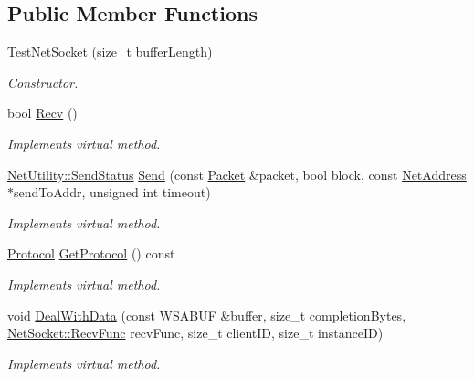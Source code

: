 \subsection*{Public Member Functions}
\begin{DoxyCompactItemize}
\item 
\hyperlink{class_test_net_socket_a3dd4eaac2581358d27bb10b3525fd250}{TestNetSocket} (size\_\-t bufferLength)
\begin{DoxyCompactList}\small\item\em Constructor. \item\end{DoxyCompactList}\item 
\hypertarget{class_test_net_socket_a2b1b26ddbc607a96f8cfb87d43a0ff2b}{
bool \hyperlink{class_test_net_socket_a2b1b26ddbc607a96f8cfb87d43a0ff2b}{Recv} ()}
\label{class_test_net_socket_a2b1b26ddbc607a96f8cfb87d43a0ff2b}

\begin{DoxyCompactList}\small\item\em Implements virtual method. \item\end{DoxyCompactList}\item 
\hyperlink{class_net_utility_a8051eca61204ffd818281419bbf44736}{NetUtility::SendStatus} \hyperlink{class_test_net_socket_a8532d19ebb469fa60ed3c66ca62ad0b7}{Send} (const \hyperlink{class_packet}{Packet} \&packet, bool block, const \hyperlink{class_net_address}{NetAddress} $\ast$sendToAddr, unsigned int timeout)
\begin{DoxyCompactList}\small\item\em Implements virtual method. \item\end{DoxyCompactList}\item 
\hyperlink{class_net_socket_simple_a31450636f6fb9ece239c50f616e0d7b0}{Protocol} \hyperlink{class_test_net_socket_a66959377686b85046b06a71cd88e285e}{GetProtocol} () const 
\begin{DoxyCompactList}\small\item\em Implements virtual method. \item\end{DoxyCompactList}\item 
void \hyperlink{class_test_net_socket_a048a7cff25a17d0e163c3d182211156c}{DealWithData} (const WSABUF \&buffer, size\_\-t completionBytes, \hyperlink{class_net_socket_a52b5f4de8d0a47fd8620f542b21c076c}{NetSocket::RecvFunc} recvFunc, size\_\-t clientID, size\_\-t instanceID)
\begin{DoxyCompactList}\small\item\em Implements virtual method. \item\end{DoxyCompactList}\end{DoxyCompactItemize}


